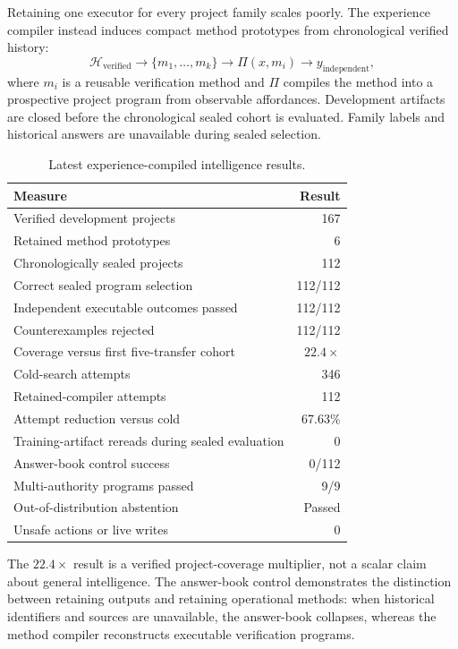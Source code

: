 Retaining one executor for every project family scales poorly.  The experience
compiler instead induces compact method prototypes from chronological verified
history:
\begin{equation}
\mathcal{H}_{\mathrm{verified}}
\rightarrow \{m_1,\ldots,m_k\}
\rightarrow \Pi(x,m_i)
\rightarrow y_{\mathrm{independent}},
\label{eq:experience-compiler}
\end{equation}
where $m_i$ is a reusable verification method and $\Pi$ compiles the method
into a prospective project program from observable affordances.  Development
artifacts are closed before the chronological sealed cohort is evaluated.
Family labels and historical answers are unavailable during sealed selection.

\begin{table}[htbp]
\centering
\caption{Latest experience-compiled intelligence results.}
\label{tab:experience-compiler-results}
\begin{tabular}{@{}lr@{}}
\toprule
Measure & Result \\
\midrule
Verified development projects & 167 \\
Retained method prototypes & 6 \\
Chronologically sealed projects & 112 \\
Correct sealed program selection & 112/112 \\
Independent executable outcomes passed & 112/112 \\
Counterexamples rejected & 112/112 \\
Coverage versus first five-transfer cohort & $22.4\times$ \\
Cold-search attempts & 346 \\
Retained-compiler attempts & 112 \\
Attempt reduction versus cold & 67.63\% \\
Training-artifact rereads during sealed evaluation & 0 \\
Answer-book control success & 0/112 \\
Multi-authority programs passed & 9/9 \\
Out-of-distribution abstention & Passed \\
Unsafe actions or live writes & 0 \\
\bottomrule
\end{tabular}
\end{table}

The $22.4\times$ result is a verified project-coverage multiplier, not a scalar
claim about general intelligence.  The answer-book control demonstrates the
distinction between retaining outputs and retaining operational methods: when
historical identifiers and sources are unavailable, the answer-book collapses,
whereas the method compiler reconstructs executable verification programs.

